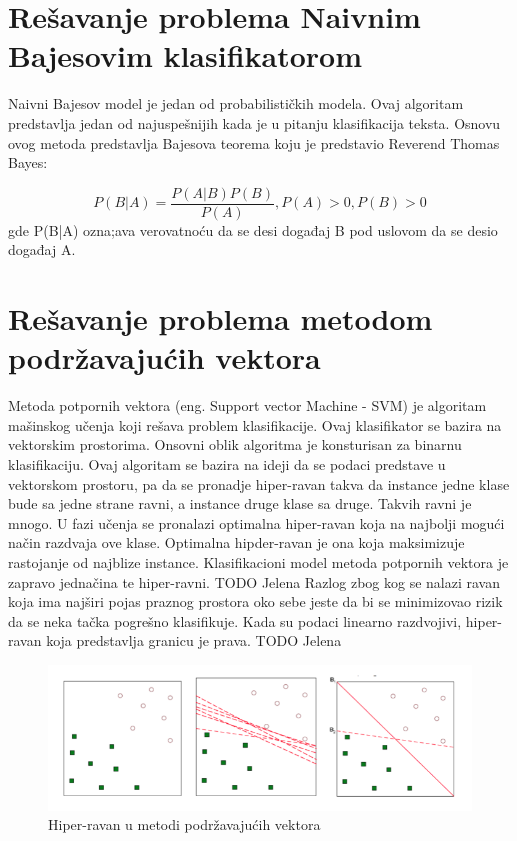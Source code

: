 \documentclass[12pt,oneside]{memoir}
\begin{document}
\chapter{Rešavanje problema Naivnim Bajesovim klasifikatorom}

Naivni Bajesov model je jedan od probabilističkih modela.  Ovaj algoritam predstavlja jedan od najuspešnijih kada je u pitanju klasifikacija teksta.  Osnovu ovog metoda predstavlja Bajesova teorema koju je predstavio Reverend Thomas Bayes:

\begin{equation}
	P(B|A) = \frac{P(A|B)P(B)}{P(A)}, P(A)>0, P(B)>0
\end{equation}
{\setlength{\parindent}{0cm}
gde P(B|A) ozna;ava verovatnoću da se desi događaj B pod uslovom da se desio događaj A. 
}

\chapter{Rešavanje problema metodom podržavajućih vektora}

Metoda potpornih vektora (eng.  Support vector Machine - SVM) je algoritam mašinskog učenja koji rešava problem klasifikacije.  Ovaj klasifikator se bazira na vektorskim prostorima.  Onsovni oblik algoritma je konsturisan za binarnu klasifikaciju.  
Ovaj algoritam se bazira na ideji da se podaci predstave u vektorskom prostoru, pa da se pronadje hiper-ravan takva da instance jedne klase bude sa jedne strane ravni,  a instance druge klase sa druge.  Takvih ravni je mnogo.
U fazi učenja se pronalazi optimalna hiper-ravan koja na najbolji mogući način razdvaja ove klase.  Optimalna hipder-ravan je ona koja maksimizuje rastojanje od najblize instance.  Klasifikacioni model metoda potpornih vektora je zapravo jednačina te hiper-ravni.   TODO Jelena Razlog zbog kog se nalazi ravan koja ima najširi pojas praznog prostora oko sebe jeste da bi se minimizovao rizik da se neka tačka pogrešno klasifikuje.  Kada su podaci linearno razdvojivi, hiper-ravan koja predstavlja granicu je prava.  TODO Jelena

\begin{figure}[h!]
\centering
\includegraphics[width=.7\textwidth]{images/svm.png}
\caption{ Hiper-ravan u metodi podržavajućih vektora }
\label{img:svm_1}
\end{figure}
\end{document}
